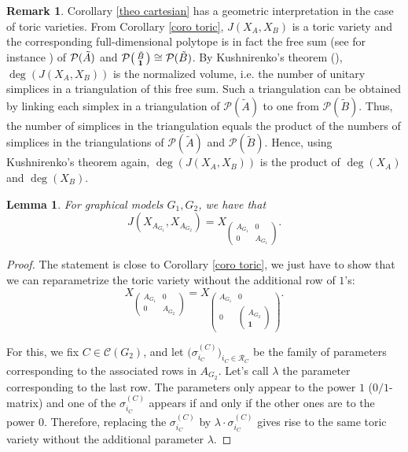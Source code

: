 \documentclass[11pt]{amsart}
\numberwithin{equation}{section}
\theoremstyle{plain}
\numberwithin{theorem}{section}
\newtheorem{lemma}[theorem]{Lemma}
\theoremstyle{definition}
\newtheorem{remark}[theorem]{Remark}
\begin{document}
\begin{remark}
   Corollary \ref{theo cartesian} has a geometric interpretation in the case of toric varieties. From Corollary \ref{coro toric}, $J(X_A,X_B)$ is a toric variety and the corresponding full-dimensional polytope is in fact the free sum (see for instance \cite{STAPLEDON201751}) of $\mathcal P(\Tilde A)$ and $\mathcal P\big(\begin{smallmatrix}
    \Tilde B\\\textbf{1}
\end{smallmatrix}\big)\cong\mathcal P(\Tilde B)$. By Kushnirenko's theorem (\cite{kushnirenko1976polyedres}), $\deg(J(X_A, X_B))$ is the normalized volume, i.e. the number of unitary simplices in a triangulation of this free sum. Such a triangulation can be obtained by linking each simplex in a triangulation of $\mathcal P(\tilde{A})$ to one from $\mathcal P(\tilde{B})$. Thus, the number of simplices in the triangulation equals the product of the numbers of simplices in the triangulations of  $\mathcal P(\tilde{A})$ and  $\mathcal P(\tilde{B})$. Hence, using Kushnirenko's theorem again, $\deg(J(X_A, X_B))$ is the product of $\deg(X_A)$ and $\deg(X_B)$.
\end{remark}

\begin{lemma}\label{Proposition $2.23$}
For graphical models $G_1,G_2$, we have that $$\displaystyle J\left(X_{A_{G_1}}, X_{A_{G_2}}\right)=X_{\left(\begin{smallmatrix}
    A_{G_1} & 0\\ 0 & A_{G_1}
\end{smallmatrix}\right)}.$$
\end{lemma}
\begin{proof} The statement is close to Corollary \ref{coro toric}, we just have to show that we can reparametrize the toric variety without the additional row of $1$'s: $$X_{\left(\begin{smallmatrix}
    A_{G_1} & 0\\ 0 & A_{G_2}
\end{smallmatrix}\right)}=X_{\left(\begin{smallmatrix}
    A_{G_1}&0\\0&\left(\begin{smallmatrix}
        A_{G_2}\\\textbf{1}
    \end{smallmatrix}\right)
\end{smallmatrix}\right)}.$$

\noindent For this, we fix $C\in\mathcal C(G_2)$, and let $\big(\sigma_{i_C}^{(C)}\big)_{i_C\in \mathcal R_C}$ be the family of parameters corresponding to the associated rows in $A_{G_2}$. Let's call $\lambda$ the parameter corresponding to the last row. The parameters only appear to the power $1$ ($0/1$-matrix) and one of the $\sigma_{i_C}^{(C)}$ appears if and only if the other ones are to the power $0$. Therefore, replacing the $\sigma_{i_C}^{(C)}$ by $\lambda\cdot\sigma_{i_C}^{(C)}$ gives rise to the same toric variety without the additional parameter $\lambda$. 
\end{proof}
\end{document}
